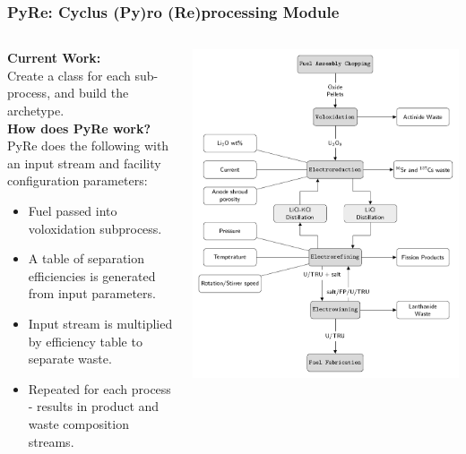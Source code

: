 \documentclass[9pt]{beamer}
\begin{document}
	\begin{frame}
	\frametitle{PyRe: Cyclus (Py)ro (Re)processing Module}
	\begin{columns}
		\begin{column}{.45\textwidth}
			\textbf{Current Work:} \\
			Create a class for each sub-process, and build the archetype. \\
			\vspace{1mm}
			\textbf{How does PyRe work?} \\
			PyRe does the following with an input stream and facility configuration parameters: 
			\begin{itemize}
				\item Fuel passed into voloxidation subprocess.
				\item A table of separation efficiencies is generated from input parameters.
				\item Input stream is multiplied by efficiency table to separate waste.
				\item Repeated for each process - results in product and waste composition streams.
			\end{itemize}
		\end{column}
		\begin{column}{.55\textwidth}
			\includegraphics[width=\linewidth]{flowchart}
		\end{column}
	\end{columns}
	\end{frame}
\end{document}
